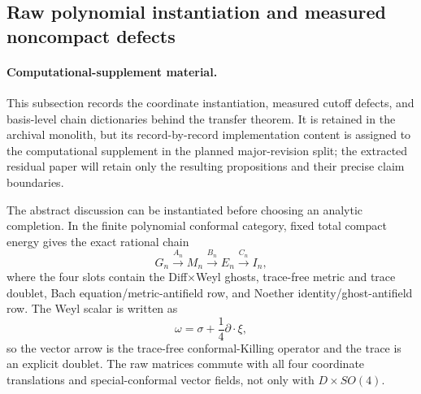 \documentclass[11pt]{article}
\theoremstyle{definition}
\theoremstyle{remark}
\begin{document}
\subsection{Raw polynomial instantiation and measured noncompact defects}

\paragraph{Computational-supplement material.}
This subsection records the coordinate instantiation, measured cutoff
defects, and basis-level chain dictionaries behind the transfer theorem.  It
is retained in the archival monolith, but its record-by-record implementation
content is assigned to the computational supplement in the planned
major-revision split; the extracted residual paper will retain only the
resulting propositions and their precise claim boundaries.

The abstract discussion can be instantiated before choosing an analytic
completion.  In the finite polynomial conformal category, fixed total
compact energy gives the exact rational chain
\begin{equation}\label{eq:raw-polynomial-chain}
 G_n\xrightarrow{A_n}M_n\xrightarrow{B_n}E_n
 \xrightarrow{C_n}I_n,
\end{equation}
where the four slots contain the Diff$\times$Weyl ghosts, trace-free metric
and trace doublet, Bach equation/metric-antifield row, and Noether
identity/ghost-antifield row.  The Weyl scalar is written as
\begin{equation}
 \omega=\sigma+\frac14\partial\!\cdot\!\xi,
\end{equation}
so the vector arrow is the trace-free conformal-Killing operator and the
trace is an explicit doublet.  The raw matrices commute with all four
coordinate translations and special-conformal vector fields, not only with
$D\times SO(4)$.
\end{document}
